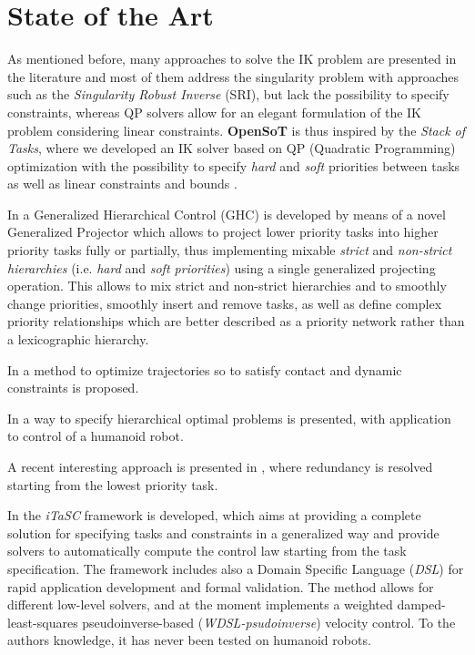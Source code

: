\section{State of the Art}
\label{sec:state_of_the_art}
As mentioned before, many approaches to solve the IK problem are presented in the literature and most of them address  the singularity problem with approaches such as the \emph{Singularity Robust Inverse} (SRI), but lack the possibility to specify constraints, whereas QP solvers allow for an elegant formulation of the IK problem considering linear constraints.
\textbf{OpenSoT} is thus inspired by the \emph{Stack of Tasks}, where we developed an IK solver based on QP (Quadratic Programming) optimization with the possibility to specify \emph{hard} \cite{kanoun2009prioritizing} and \emph{soft} \cite{chiacchio1991closed} priorities between tasks as well as linear constraints and bounds \cite{escande2014hierarchical}.

In \cite{Liu2015-yq} a Generalized Hierarchical Control (GHC) is developed by means of a novel Generalized Projector which allows to project lower priority tasks into higher priority tasks fully or partially, thus implementing mixable \emph{strict} and \emph{non-strict hierarchies} (i.e. \emph{hard} and \emph{soft priorities}) using a single generalized projecting operation. This allows to mix strict and non-strict hierarchies and to smoothly change priorities, smoothly insert and remove tasks, as well as define complex priority relationships which are better described as a priority network rather than a lexicographic hierarchy.

In \cite{Hauser2014-sq} a method to optimize trajectories so to satisfy contact and dynamic constraints is proposed.

In \cite{Del_Prete2014-ph} a way to specify hierarchical optimal problems is presented, with application to control of a humanoid robot.

A recent interesting approach is presented in \cite{DBLPConfIrosFlacco014}, where redundancy is resolved starting from the lowest priority task.

In \cite{De_Schutter2007-to,Decre2009-om,Decre2013-yt,Smits2009-nv,Vanthienen2012-ed,Vanthienen2013-pl} the \emph{iTaSC} framework is developed, which aims at providing a complete solution for specifying tasks and constraints in a generalized way and provide solvers to automatically compute the control law starting from the task specification. The framework includes also a Domain Specific Language (\emph{DSL}) for rapid application development and formal validation. The method allows for different low-level solvers, and at the moment implements a weighted damped-least-squares pseudoinverse-based (\emph{WDSL-psudoinverse}) velocity control. To the authors knowledge, it has never been tested on humanoid robots.

